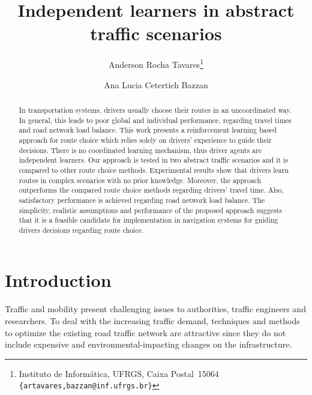 \documentclass{RITA}
\title{Independent learners in abstract traffic scenarios}
\author{
  Anderson Rocha Tavares\footnote{Instituto de Inform\'atica, UFRGS, Caixa Postal~15064\\
  \texttt{\{artavares,bazzan@inf.ufrgs.br\}}}
  \and Ana Lucia Cetertich Bazzan\footnotemark[1]
}
\begin{document}
\maketitle

\begin{abstract}
In transportation systems, drivers usually choose their routes in an uncoordinated way. In general, this leads to poor global and individual performance, regarding travel times and road network load balance. This work presents a reinforcement learning based approach for route choice which relies solely on drivers' experience to guide their decisions. 
There is no coordinated learning mechanism, thus driver agents are independent learners. Our approach is tested in two abstract traffic scenarios and it is compared to other route choice methods. 
Experimental results show that drivers learn routes in complex scenarios with no prior knowledge. Moreover, the approach outperforms the compared route choice methods regarding drivers' travel time. Also, satisfactory performance is achieved regarding road network load balance. 
The simplicity, realistic assumptions and performance of the proposed approach suggests that it is a feasible candidate for implementation in navigation systems for guiding drivers decisions regarding route choice.
\end{abstract}




\section{Introduction}
\label{sec:intro}

Traffic and mobility present challenging issues to authorities, traffic engineers and researchers. To deal with the increasing traffic demand, techniques and methods to optimize the existing road traffic network are attractive since they do not include expensive and environmental-impacting changes on the infrastructure.
\end{document}
